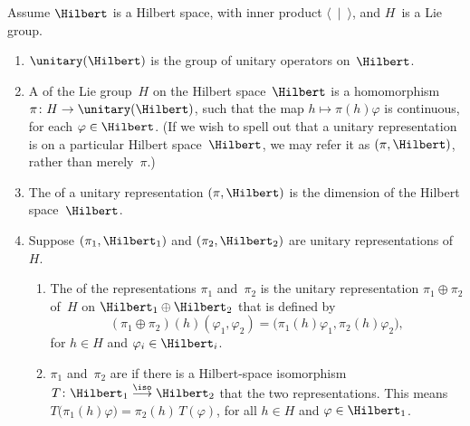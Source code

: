 \begin{defn}
Assume $\Hilbert$ is a Hilbert space, with inner product $\langle~\mid~\rangle$,
and $H$~is a Lie group.
	\begin{enumerate}
	
	\item $\unitary(\Hilbert)$ is the group of {unitary operators} on~$\Hilbert$. 
	
	\item A  of the Lie group~$H$ on the Hilbert space~$\Hilbert$ is a homomorphism 
	$\pi \colon H \to \unitary(\Hilbert)$, 
	such that the map $h \mapsto \pi(h) \varphi$ is continuous, for each $\varphi \in \Hilbert$. (If we wish to spell out that a unitary representation is on a particular Hilbert space~$\Hilbert$, we may refer it as $(\pi, \Hilbert)$, rather than merely~$\pi$.) 
	
	\item The  of a unitary representation $(\pi,\Hilbert)$ is the dimension of the Hilbert space~$\Hilbert$.

	\item Suppose $(\pi_1, \Hilbert_1)$ and $(\pi_2, \Hilbert_2)$ are unitary representations  of~$H$.
\noprelistbreak
		\begin{enumerate}
		
		\item The  of the representations $\pi_1$ and~$\pi_2$ is the unitary representation $\pi_1 \oplus \pi_2$ of~$H$ on $\Hilbert_1 \oplus \Hilbert_2$ that is defined by 
			$$(\pi_1 \oplus \pi_2)(h)(\varphi_1,\varphi_2) = \bigl( \pi_1(h) \varphi_1, \pi_2(h) \varphi_2 \bigr), $$
		for $h \in H$ and $\varphi_i \in \Hilbert_i$.
		
		\item $\pi_1$ and~$\pi_2$ are  if there is a Hilbert-space isomorphism $T \colon \Hilbert_1 \stackrel{\iso}{\longrightarrow} \Hilbert_2$ that  the two representations. This means $T \bigl( \pi_1(h) \varphi \bigr) = \pi_2(h) \, T(\varphi)$, for all $h \in H$ and $\varphi \in \Hilbert_1$.
		\end{enumerate}

	\end{enumerate}
\end{defn}

